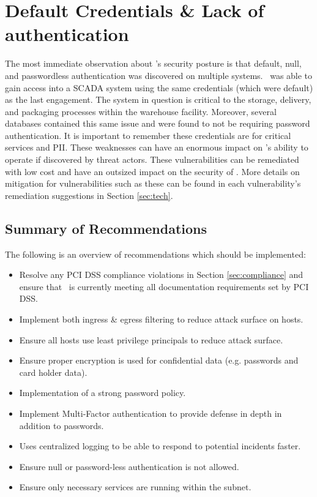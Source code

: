 \section*{Default Credentials \& Lack of authentication}
The most immediate observation about \cptc's security posture is that default, null, and passwordless authentication was discovered on multiple systems. \teamname\ was able to gain access into a SCADA system using the same credentials (which were default) as the last engagement.  The system in question is critical to the storage, delivery, and packaging processes within the warehouse facility. Moreover, several databases contained this same issue and were found to not be requiring password authentication. It is important to remember these credentials are for critical services and PII. These weaknesses can have an enormous impact on \cptc's ability to operate if discovered by threat actors. These vulnerabilities can be remediated with low cost and have an outsized impact on the security of \cptc. More details on mitigation for vulnerabilities such as these can be found in each vulnerability's remediation suggestions in Section \ref{sec:tech}. 


    

\subsection{Summary of Recommendations}

The following is an overview of recommendations which should be implemented:

\begin{itemize}
    \item Resolve any PCI DSS compliance violations in Section \ref{sec:compliance} and ensure that \cptc\ is currently meeting all documentation requirements set by PCI DSS.
    \item Implement both ingress \& egress filtering to reduce attack surface on hosts.
    \item Ensure all hosts use least privilege principals to reduce attack surface.
    \item Ensure proper encryption is used for confidential data (e.g. passwords and card holder data).
    \item Implementation of a strong password policy.
    \item Implement Multi-Factor authentication to provide defense in depth in addition to passwords.
    \item Uses centralized logging to be able to respond to potential incidents faster.
    \item Ensure null or password-less authentication is not allowed.
    \item Ensure only necessary services are running within the subnet.
\end{itemize}

